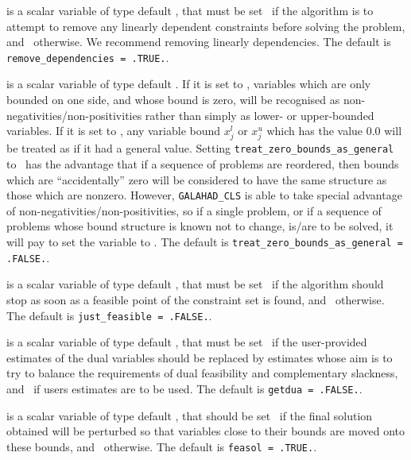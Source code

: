 \documentclass{galahad}
\newcommand{\libraryname}{GALAHAD}
\newcommand{\packagename}{CLS}
\newcommand{\fullpackagename}{\libraryname\_\packagename}
\begin{document}
\begin{description}
 is a scalar variable of type 
default \logical, that must be set \true\ if the algorithm
is to attempt to remove any linearly dependent constraints before
solving the problem, and \false\ otherwise. 
We recommend removing linearly dependencies.
The default is {\tt remove\_dependencies = .TRUE.}.

 is a scalar variable of type 
default \logical.
If it is set to \false, variables which 
are only bounded on one side, and whose bound is zero,
will be recognised as non-negativities/non-positivities rather than simply as
lower- or upper-bounded variables.
If it is set to \true, any variable bound 
$x_{j}^{l}$ or $x_{j}^{u}$ which has the value 0.0 will be
treated as if it had a general value.
Setting {\tt treat\_zero\_bounds\_as\_general} to \true\ has the advantage
that if a sequence of problems are reordered, then bounds which are
``accidentally'' zero will be considered to have the same structure as
those which are nonzero. However, {\tt \fullpackagename} is
able to take special advantage of non-negativities/non-positivities, so
if a single problem, or if a sequence of problems whose 
bound structure is known not to change, is/are to be solved, 
it will pay to set the variable to \false.
The default is {\tt treat\_zero\_bounds\_as\_general = .FALSE.}.

 is a scalar variable of type default \logical, that 
must be set \true\ if the algorithm should stop as soon as a feasible point
of the constraint set is found, and \false\ otherwise. 
The default is {\tt just\_feasible = .FALSE.}.

 is a scalar variable of type default \logical, that 
must be set \true\ if the user-provided estimates of the dual variables
should be replaced by estimates whose aim is to try to balance the
requirements of dual feasibility and complementary slackness,
and \false\ if users estimates are to be used.
The default is {\tt getdua = .FALSE.}.

 is a scalar variable of type default \logical, that 
should be set \true\ 
if the final solution obtained will be perturbed 
so that variables close to their bounds are moved onto these bounds,
and \false\ otherwise. 
The default is {\tt feasol = .TRUE.}.

\end{description}

\end{document}
